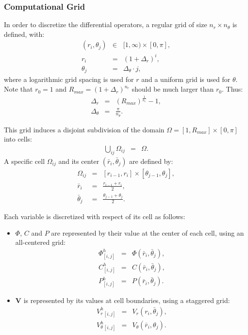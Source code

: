 \documentclass[final]{elsarticle}
\newcommand{\pars}[1]{\left(#1\right)}
\newcommand\bV{\boldsymbol{V}}
\begin{document}
\subsubsection{Computational Grid}
In order to discretize the differential operators, 
a regular grid of size $n_r \times n_\theta$ is defined, with:
\begin{eqnarray*}
(r_i,\theta_j) &\in& [1, \infty) \times [0,\pi], \\ 
r_i &=& (1+\Delta_r)^i, \\
\theta_j &=& \Delta_\theta \cdot j,
\end{eqnarray*}
where a logarithmic grid spacing is used for $r$ and a uniform grid is used for $\theta$.
Note that $r_0 = 1$ and $R_{max} = (1+\Delta_r)^{n_r}$ should be much 
larger than $r_0$. Thus:
\begin{eqnarray*}
\Delta_r &=& \pars{R_{max}} ^ \frac{1}{n_r} - 1, \\
\Delta_\theta &=& \frac{\pi}{n_\theta}.
\end{eqnarray*}

This grid induces a disjoint subdivision of the domain 
$\Omega = [1, R_{max}] \times [0,\pi]$ into cells:
\begin{eqnarray*}
\bigcup_{ij}\Omega_{ij} &=& \Omega.
\end{eqnarray*}
A specific cell $\Omega_{ij}$ and its center $(\bar{r}_i, \bar{\theta}_j)$ are defined by:
\begin{eqnarray*}
\Omega_{ij} &=& [r_{i-1}, r_{i}] \times [\theta_{j-1}, \theta_{j}], \\
\bar{r}_i &=& \frac{r_{i-1} + r_{i}}{2}, \\
\bar{\theta}_j &=& \frac{\theta_{j-1} + \theta_{j}}{2}.
\end{eqnarray*}

Each variable is discretized with respect of its cell as follows:
\begin{itemize}
\item $\varPhi$, $C$ and $P$ are represented by their value at the center of each cell, 
using an all-centered grid:
\begin{eqnarray*}
\varPhi^h_{[i,j]} &=& \varPhi(\bar{r}_i, \bar{\theta}_j), \\
C^h_{[i,j]} &=& C(\bar{r}_i, \bar{\theta}_j), \\
P^h_{[i,j]} &=& P(\bar{r}_i, \bar{\theta}_j).
\end{eqnarray*}
\item $\bV$ is represented by its values at cell boundaries, using a staggered grid:
\begin{eqnarray*}
V_r^h{}_{[i,j]} &=& V_r(r_i, \bar{\theta}_j), \\
V_\theta^h{}_{[i,j]} &=& V_\theta(\bar{r}_i, {\theta}_j).
\end{eqnarray*}
\end{itemize}
\end{document}
